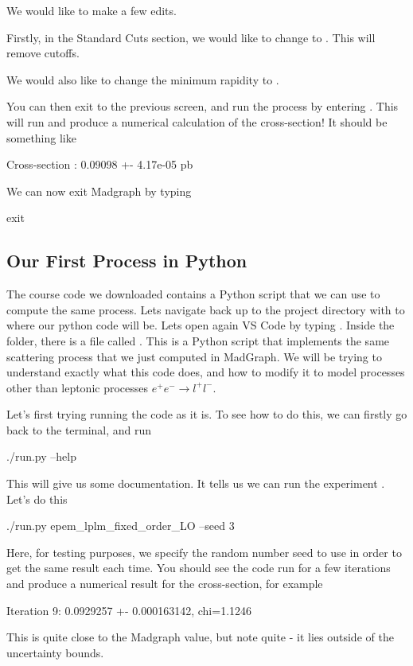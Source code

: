 We would like to make a few edits. 

Firstly, in the Standard Cuts section, we would like to change  to . This will remove cutoffs. 

We would also like to change the minimum rapidity  to .

You can then exit to the previous screen, and run the process by entering . This will run and produce a numerical calculation of the cross-section! It should be something like
\begin{codeenv}
     Cross-section :   0.09098 +- 4.17e-05 pb
\end{codeenv}

We can now exit Madgraph by typing
\begin{codeenv}
    exit
\end{codeenv}

\subsection*{Our First Process in Python}

The course code we downloaded contains a Python script that we can use to compute the same process. Lets navigate back up to the project directory with  to where our python code will be. Lets open again VS Code by typing . Inside the  folder, there is a file called . This is a Python script that implements the same scattering process that we just computed in MadGraph. We will be trying to understand exactly what this code does, and how to modify it to model processes other than leptonic processes $e^+ e^- \to l^+l^-$.

Let's first trying running the code as it is. To see how to do this, we can firstly go back to the terminal, and run
\begin{codeenv}
    ./run.py --help
\end{codeenv}
This will give us some documentation. It tells us we can run the experiment . Let's do this
\begin{codeenv}
    ./run.py epem_lplm_fixed_order_LO --seed 3
\end{codeenv}
Here, for testing purposes, we specify the random number seed to use in order to get the same result each time. You should see the code run for a few iterations and produce a numerical result for the cross-section, for example
\begin{codeenv}
     Iteration 9: 0.0929257 +- 0.000163142, chi=1.1246
\end{codeenv}
This is quite close to the Madgraph value, but note quite - it lies outside of the uncertainty bounds.


